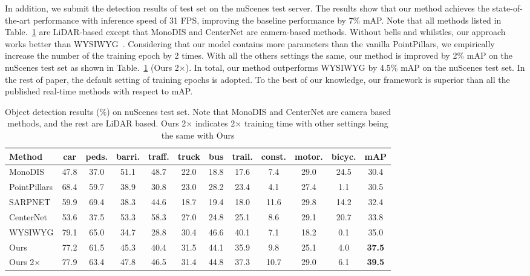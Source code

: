\documentclass[runningheads]{llncs}
\begin{document}
 In addition, we submit the detection results of test set on the nuScenes test server. The results show that our method achieves the state-of-the-art performance with inference speed of 31 FPS, improving the baseline performance by 7\% mAP. Note that all methods listed in Table.~\ref{table:2} are LiDAR-based except that MonoDIS \cite{simonelli2019disentangling} and CenterNet\cite{zhou2019objects} are camera-based methods. Without bells and whilstles, our approach works better than WYSIWYG~\cite{hu2019you}. 
 Considering that our model contains more parameters than the vanilla PointPillars, we empirically increase the number of the training epoch by 2 times. With all the others settings the same, our method is improved by 2\% mAP on the nuScenes test set as shown in Table.~\ref{table:2} (Ours 2$\times$). In total, our method outperforms WYSIWYG\cite{hu2019you} by 4.5\% mAP on the nuScenes test set. In the rest of paper, the default setting of training epochs is adopted.
 To the best of our knowledge, our framework is superior than all the published real-time methods with respect to mAP.
 
 
\begin{table}[h!]
\centering
\caption{Object detection results (\%) on nuScenes test set. Note that MonoDIS and CenterNet are camera based methods, and the rest are LiDAR based. Ours 2$\times$ indicates 2$\times$ training time with other settings being the same with Ours}
\begin{tabular}{l c c c c c c c c c c c} 
 \hline
 Method & car & peds. & barri. & traff. & truck & bus & trail. & const. & motor. & bicyc. & mAP \\ [0.5ex] 
 \hline
  MonoDIS \cite{simonelli2019disentangling} & 47.8 & 37.0 & 51.1 & 48.7 & 22.0 & 18.8 & 17.6 & 7.4 & 29.0 & 24.5 & 30.4 \\
  PointPillars \cite{lang2019PointPillars}  & 68.4 & 59.7 & 38.9 & 30.8 & 23.0 & 28.2 & 23.4 & 4.1 & 27.4 & 1.1 & 30.5\\
  SARPNET \cite{ye2020sarpnet} & 59.9 & 69.4 & 38.3 & 44.6 & 18.7 & 19.4 & 18.0 & 11.6 & 29.8 & 14.2 & 32.4 \\
  CenterNet \cite{zhou2019objects} & 53.6 & 37.5 & 53.3 & 58.3 & 27.0 & 24.8 & 25.1 & 8.6 & 29.1 & 20.7 & 33.8 \\ 
  WYSIWYG \cite{hu2019you}  & 79.1 & 65.0 & 34.7 & 28.8 & 30.4 & 46.6 & 40.1 & 7.1 & 18.2 & 0.1 & 35.0 \\

  \hline
   Ours & 77.2 & 61.5 & 45.3 & 40.4 & 31.5 & 44.1 & 35.9 & 9.8 & 25.1 & 4.0 & \bf 37.5 \\ 
   Ours 2$\times$ & 77.9 & 63.4 & 47.8 & 46.5 & 31.4 & 44.8 & 37.3 & 10.7 & 29.0 & 6.1 & \bf 39.5 \\ 

 \hline
\end{tabular}
\label{table:2}
\end{table}
\end{document}

